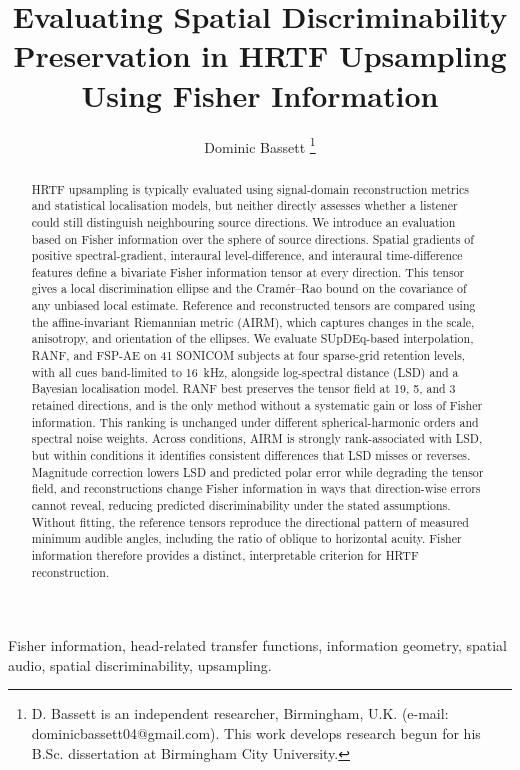 \documentclass[journal]{IEEEtran}
\title{Evaluating Spatial Discriminability Preservation in HRTF Upsampling Using Fisher Information}
\author{Dominic Bassett%
\thanks{D. Bassett is an independent researcher, Birmingham, U.K. (e-mail: dominicbassett04@gmail.com). This work develops research begun for his B.Sc. dissertation at Birmingham City University.}}
\begin{document}
\maketitle

\begin{abstract}
HRTF upsampling is typically evaluated using signal-domain reconstruction metrics and statistical localisation models, but neither directly assesses whether a listener could still distinguish neighbouring source directions. We introduce an evaluation based on Fisher information over the sphere of source directions. Spatial gradients of positive spectral-gradient, interaural level-difference, and interaural time-difference features define a bivariate Fisher information tensor at every direction. This tensor gives a local discrimination ellipse and the Cram\'er--Rao bound on the covariance of any unbiased local estimate. Reference and reconstructed tensors are compared using the affine-invariant Riemannian metric (AIRM), which captures changes in the scale, anisotropy, and orientation of the ellipses. We evaluate SUpDEq-based interpolation, RANF, and FSP-AE on 41 SONICOM subjects at four sparse-grid retention levels, with all cues band-limited to 16~kHz, alongside log-spectral distance (LSD) and a Bayesian localisation model. RANF best preserves the tensor field at 19, 5, and 3 retained directions, and is the only method without a systematic gain or loss of Fisher information. This ranking is unchanged under different spherical-harmonic orders and spectral noise weights. Across conditions, AIRM is strongly rank-associated with LSD, but within conditions it identifies consistent differences that LSD misses or reverses. Magnitude correction lowers LSD and predicted polar error while degrading the tensor field, and reconstructions change Fisher information in ways that direction-wise errors cannot reveal, reducing predicted discriminability under the stated assumptions. Without fitting, the reference tensors reproduce the directional pattern of measured minimum audible angles, including the ratio of oblique to horizontal acuity. Fisher information therefore provides a distinct, interpretable criterion for HRTF reconstruction.
\end{abstract}

\begin{IEEEkeywords}
Fisher information, head-related transfer functions, information geometry,
spatial audio, spatial discriminability, upsampling.
\end{IEEEkeywords}
\end{document}
